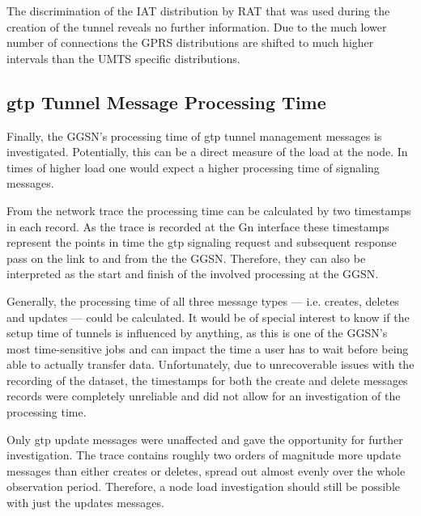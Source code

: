 The discrimination of the \gls{IAT} distribution by \gls{RAT} that was used during the creation of the tunnel reveals no further information. Due to the much lower number of connections the \gls{GPRS} distributions are shifted to much higher intervals than the \gls{UMTS} specific distributions.


\subsection{\texorpdfstring{\acrshort{gtp}}{GTP} Tunnel Message Processing Time}

Finally, the \gls{GGSN}'s processing time of \gls{gtp} tunnel management messages is investigated. Potentially, this can be a direct measure of the load at the node. In times of higher load one would expect a higher processing time of signaling messages.

From the network trace the processing time can be calculated by two timestamps in each record.
As the trace is recorded at the Gn interface these timestamps represent the points in time the \gls{gtp} signaling request and subsequent response pass on the link to and from the the \gls{GGSN}. Therefore, they can also be interpreted as the start and finish of the involved processing at the \gls{GGSN}.

Generally, the processing time of all three message types --- i.e. creates, deletes and updates --- could be calculated. It would be of special interest to know if the setup time of tunnels is influenced by anything, as this is one of the \gls{GGSN}'s most time-sensitive jobs and can impact the time a user has to wait before being able to actually transfer data. Unfortunately, due to unrecoverable issues with the recording of the dataset, the timestamps for both the create and delete messages records were completely unreliable and did not allow for an investigation of the processing time. 

Only \gls{gtp} update messages were unaffected and gave the opportunity for further investigation. The trace contains roughly two orders of magnitude more update messages than either creates or deletes, spread out almost evenly over the whole observation period. Therefore, a node load investigation should still be possible with just the updates messages.

